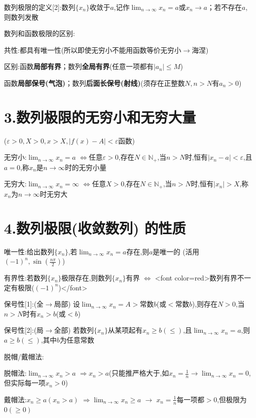 \documentclass[11pt,a4paper,UTF8]{ctexart}
\begin{document}
数列极限的定义[2]:数列$\{x_n\}$收敛于$a$,记作$\lim_{n \to \infty} x_n = a$或$x_n \to a$；若不存在$a$,则数列发散

数列和函数极限的区别:

\begin{solbox}[分步推导与答题规范]
  共性:都具有唯一性(所以即使无穷小不能用函数等价无穷小$\to$海涅)

  区别:函数\textbf{局部有界}；数列\textbf{全局有界}(任意一项都有$|a_n| \le M$)

      函数\textbf{局部保号(气泡)}；数列\textbf{后面长保号(射线)}(须存在正整数$N, n>N$有$a_n>0$)
\end{solbox}


\section{3.数列极限的无穷小和无穷大量}
($\varepsilon > 0, X > 0, x > X, |f(x)-A|<\varepsilon$函数)

无穷小:$\lim_{n \to \infty} x_n = a$ $\Leftrightarrow$任意$\varepsilon > 0$,存在$N \in \mathbb{N}_+$,当$n > N$时,恒有$|x_n - a| < \varepsilon$,且$a=0$,称$x_n$是$n \to \infty$时的无穷小量

无穷大:$\lim_{n \to \infty} x_n = \infty$ $\Leftrightarrow$任意$X > 0$,存在$N \in \mathbb{N}_+$,当$n > N$时,恒有$|x_n| > X$,称$x_n$为$n \to \infty$时无穷大


\section{4.数列极限(收敛数列) 的性质}
唯一性:给出数列$\{x_n\}$,若$\lim_{n \to \infty} x_n = a$存在,则$a$是唯一的		(活用$(-1)^n, \sin(\frac{n\pi}{2})$)

有界性:若数列$\{x_n\}$极限存在,则数列$\{x_n\}$有界	$\Leftrightarrow$		<font color=red>数列有界不一定有极限($(-1)^n$)</font>

保号性[1]:(全$\to$局部) 设$\lim_{n \to \infty} x_n = A > \text{常数}b$(或$<\text{常数}b$),则存在$N > 0$,当$n > N$时有$x_n > b$(或$<b$)

保号性[2]:(局$\to$全部) 若数列$\{x_n\}$从某项起有$x_n \ge b(\le)$,且$\lim_{n \to \infty} x_n = a$,则$a \ge b(\le)$,其中$b$为任意常数

脱帽/戴帽法:

\begin{solbox}[分步推导与答题规范]
  脱帽法:$\lim_{n \to \infty} x_n > a$	$\Rightarrow x_n > a$(只能推严格大于,如$x_n = \frac{1}{n} \to \lim_{n \to \infty} x_n = 0$,但实际每一项$x_n > 0$)

  戴帽法:$x_n \ge a(x_n > a)$ $\Rightarrow \lim_{n \to \infty} x_n \ge a$ $\to$ $x_n = \frac{1}{n}$每一项都$>0$,但极限为$0(\ge 0)$
\end{solbox}
\end{document}
